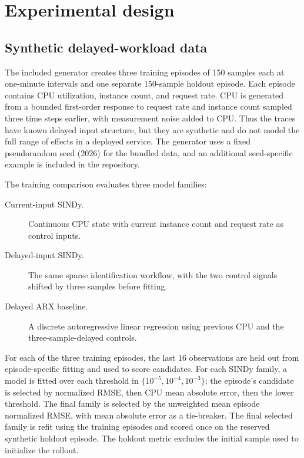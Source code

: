 \documentclass[11pt]{article}
\begin{document}
\section{Experimental design}

\subsection{Synthetic delayed-workload data}

The included generator creates three training episodes of 150 samples each at one-minute intervals and one separate 150-sample holdout episode. Each episode contains CPU utilization, instance count, and request rate. CPU is generated from a bounded first-order response to request rate and instance count sampled three time steps earlier, with measurement noise added to CPU. Thus the traces have known delayed input structure, but they are synthetic and do not model the full range of effects in a deployed service. The generator uses a fixed pseudorandom seed (2026) for the bundled data, and an additional seed-specific example is included in the repository.

The training comparison evaluates three model families:
\begin{description}
  \item[Current-input SINDy.] Continuous CPU state with current instance count and request rate as control inputs.
  \item[Delayed-input SINDy.] The same sparse identification workflow, with the two control signals shifted by three samples before fitting.
  \item[Delayed ARX baseline.] A discrete autoregressive linear regression using previous CPU and the three-sample-delayed controls.
\end{description}

For each of the three training episodes, the last 16 observations are held out from episode-specific fitting and used to score candidates. For each SINDy family, a model is fitted over each threshold in $\{10^{-5},10^{-4},10^{-3}\}$; the episode's candidate is selected by normalized RMSE, then CPU mean absolute error, then the lower threshold. The final family is selected by the unweighted mean episode normalized RMSE, with mean absolute error as a tie-breaker. The final selected family is refit using the training episodes and scored once on the reserved synthetic holdout episode. The holdout metric excludes the initial sample used to initialize the rollout.
\end{document}

